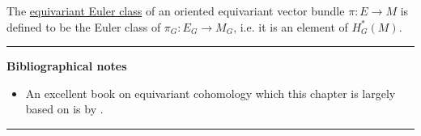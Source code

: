 The \underline{equivariant Euler class} of an oriented equivariant vector bundle
$\pi : E \to M$ is defined to be the Euler class of $\pi_G : E_G \to M_G$, i.e.
it is an element of $H_G^*(M)$. 

\vspace{5mm}
\hrule 
\vspace{5mm}

\textbf{Bibliographical notes}
{\small
\begin{itemize}
	\item An excellent book on equivariant cohomology which this chapter is
	largely based on is  by
	\citet{equivariant_tu}.
\end{itemize}
}

\hrule
